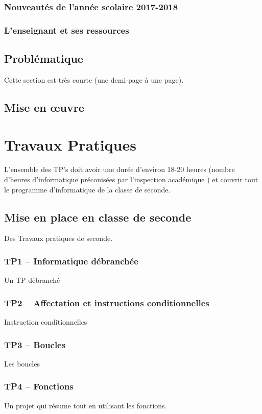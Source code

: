 \documentclass[a4paper, 12pt, appendixprefix=true]{scrreprt}%
\begin{document}
\section{Nouveautés de l'année scolaire 2017-2018}

\section{L'enseignant et ses ressources}

\chapter{Problématique}
Cette section est très courte (une demi-page à une page).

\chapter{Mise en \oe uvre}

\part{Travaux Pratiques}

L'ensemble des TP's doit avoir une durée d'environ 18-20 heures (nombre d'heures d'informatique préconisées par l'inspection académique \cite{eduscol}) et couvrir tout le programme d'informatique de la classe de seconde.

\chapter{Mise en place en classe de seconde}
Des Travaux pratiques de seconde.

\section{TP1 -- Informatique débranchée}
Un TP débranché


\section{TP2 -- Affectation et instructions conditionnelles}
Instruction conditionnelles

\section{TP3 -- Boucles}
Les boucles

\section{TP4 -- Fonctions}
Un projet qui résume tout en utilisant les fonctions. 
\end{document}
